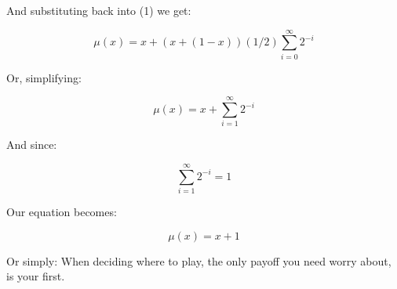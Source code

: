 \documentclass{acm_proc_article-sp}
\begin{document}
And substituting back into (1) we get:

\begin{equation}
\mu(x) = x + (x + (1 - x))(1/2)\sum_{i=0}^{\infty} 2^{-i}
\end{equation}

Or, simplifying:

\begin{equation}
\mu(x) = x + \sum_{i=1}^{\infty} 2^{-i}
\end{equation}

And since:

\begin{equation}
\sum_{i=1}^{\infty} 2^{-i} = 1
\end{equation}

Our equation becomes:

\begin{equation}
\mu(x) = x + 1
\end{equation}

Or simply: When deciding where to play, the only payoff you need worry about, is your first.





\end{document}
